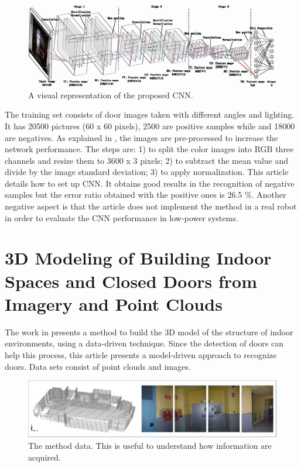 \begin{figure}[h!]
	\centering
	\includegraphics[width=0.9\linewidth]{images/CNN_doors.png}
	\caption{A visual representation of the proposed CNN.}
\end{figure}

The training set consists of door images taken with different angles and lighting. It has 20500 pictures (60 x 60 pixels), 2500 are positive samples while and 18000 are negatives. As explained in \cite{443235674}, the images are pre-processed to increase the network performance. The steps are: 1) to split the color images into RGB three channels and resize them to 3600 x 3 pixels; 2) to subtract the mean value and divide by the image standard deviation; 3) to apply normalization. This article details how to set up CNN. It obtains good results in the recognition of negative samples but the error ratio obtained with the positive ones is 26.5 \%.
Another negative aspect is that the article does not implement the method in a real robot in order to evaluate the CNN performance in low-power systems.

\newpage

\section{3D Modeling of Building Indoor Spaces and Closed Doors from Imagery and Point Clouds \cite{D_az_Vilari_o_2015}}

The work in \cite{D_az_Vilari_o_2015} presents a method to build the 3D model of the structure of indoor environments, using a data-driven technique. Since the detection of doors can help this process, this article presents a model-driven approach to recognize doors. Data sets consist of point clouds and images. 

\begin{figure}[h!]
	\centering
	\includegraphics[width=0.9\linewidth]{images/point_cloud_and_images.png}
	\caption{The method data. This is useful to understand how information are acquired.}
\end{figure}

